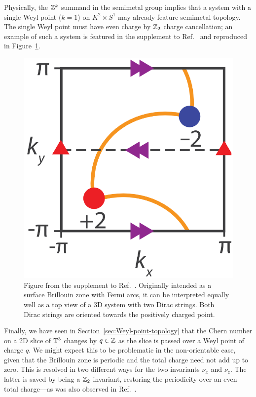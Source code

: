 Physically, the $\mathbb{Z}^k$ summand in the semimetal group implies that a system with a single Weyl point ($k=1$) on $K^2\times S^1$ may already feature semimetal topology. The single Weyl point must have even charge by $\mathbb{Z}_2$ charge cancellation; an example of such a system is featured in the supplement to Ref.~\cite{Fonseca-Vaidya_nonorientable} and reproduced in Figure~\ref{fig:double-points}.
\begin{figure}[htb!]
	\centering
	\includegraphics[width=.4\linewidth]{Images/double-points}
	\caption{Figure from the supplement to Ref.~\cite{Fonseca-Vaidya_nonorientable}. Originally intended as a surface Brillouin zone with Fermi arcs, it can be interpreted equally well as a top view of a 3D system with two Dirac strings. Both Dirac strings are oriented towards the positively charged point.}
	\label{fig:double-points}
\end{figure}

Finally, we have seen in Section~\ref{sec:Weyl-point-topology} that the Chern number on a 2D slice of $\mathbb{T}^3$ changes by $q\in\mathbb{Z}$ as the slice is passed over a Weyl point of charge $q$. We might expect this to be problematic in the non-orientable case, given that the Brillouin zone is periodic and the total charge need not add up to zero. This is resolved in two different ways for the two invariants $\nu_x$ and $\nu_z$. The latter is saved by being a $\mathbb{Z}_2$ invariant, restoring the periodicity over an even total charge---as was also observed in Ref.~\cite{Fonseca-Vaidya_nonorientable}.

